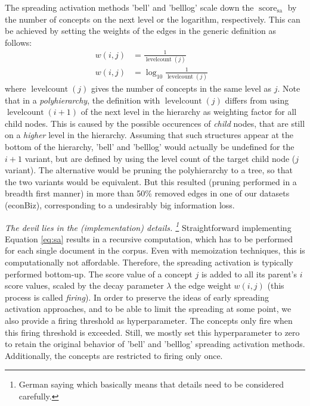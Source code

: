 \documentclass{article}
\begin{document}
The spreading activation methods 'bell' and 'belllog' scale down the $\operatorname{score}_\text{sa}$
by the number of concepts on the next level or the logarithm, respectively.
This can be achieved by setting the weights of the edges in the generic definition as follows:
\begin{align*}
	w(i,j) &= \frac{1}{\operatorname{levelcount}(j)} &\tag{bell}\\
	w(i,j) &= \log_{10} \frac{1}{\operatorname{levelcount}(j)} &\tag{belllog}
	\label{}
\end{align*}
where $\operatorname{levelcount}(j)$ gives the number of concepts in the same level as $j$.
Note that in a \emph{polyhierarchy}, the definition with $\operatorname{levelcount}(j)$
differs from using $\operatorname{levelcount}(i+1)$ of the next level in the hierarchy
as weighting factor for all child nodes.
This is caused by the possible occurences of \emph{child} nodes, that are still on a \emph{higher}
level in the hierarchy.
Assuming that such structures appear at the bottom of the hierarchy, 'bell' and 'belllog' would actually be undefined
for the $i+1$ variant, but are defined by using the level count of the target child node ($j$ variant).
The alternative would be pruning the polyhierarchy to a tree,
so that the two variants would be equivalent.
But this resulted (pruning performed in a breadth first manner) in more than 50\% removed edges
in one of our datasets (econBiz), corresponding to a undesirably big information loss.

\emph{The devil lies in the (implementation) details.
\footnote{German saying which basically means that details need to be considered carefully.}}
Straightforward implementing Equation \ref{eq:sa} results in a recursive computation,
which has to be performed for each single document in the corpus.
Even with memoization techniques, this is computationally not affordable.
Therefore, the spreading activation is typically performed bottom-up.
The score value of a concept $j$ is added to all its parent's $i$ score values,
scaled by the decay parameter $\lambda$ the edge weight $w(i,j)$ (this process is called \emph{firing}).
In order to preserve the ideas of early spreading activation approaches,
and to be able to limit the spreading at some point, we also provide
a firing threshold as hyperparameter. The concepts only fire when this firing threshold is exceeded.
Still, we mostly set this hyperparameter to zero
to retain the original behavior of 'bell' and 'belllog' spreading activation methods.
Additionally, the concepts are restricted to firing only once.
\end{document}

